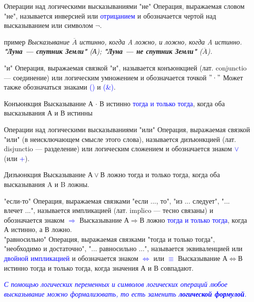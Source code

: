 \documentclass[aspectratio=169]{beamer}
\newcommand{\blu}{\textcolor{blue}}
\newcommand{\zag}{\huge\alert}
\newcommand{\n}{\normalsize}
\begin{document}
\begin{frame}[shrink=5]{Операции над логическими высказываниями}
    \zag{"не"} \n Операция, выражаемая словом \alert{"не"}, называется \alert{инверсией} или \blu{отрицанием} и обозначается чертой над высказыванием или символом $\neg$.
    
    \begin{exampleblock}{пример}
    \textit{Высказывание $\overline A$ истинно, когда A \alert{ложно}, и ложно, когда A \alert{истинно}.\\
    \textbf{"Луна — спутник Земли"} (А); \textbf{"Луна — не спутник Земли"} ($\overline A$).}
    \end{exampleblock}
    
    \zag{"и"} \n Операция, выражаемая связкой \alert{"и"}, называется \alert{конъюнкцией} (лат. conjunctio — соединение) или \alert{логическим умножением} и обозначается точкой \blu{$"\cdot"$} Может также обозначаться знаками \blu{(\wedge)} и \blu{(\&)}. 
    
    \begin{block}{Конъюнкция}
    Высказывание \alert{А $\cdot$ В} истинно \blu{тогда и только тогда}, когда оба высказывания \alert{А} и \alert{В} истинны
    \end{block}
\end{frame}
\begin{frame}[shrink=18]{Операции над логическими высказываниями}
    \zag{"или"} \n Операция, выражаемая связкой \alert{"или"} (в неисключающем смысле этого слова), называется \alert{дизъюнкцией} (лат. disjunctio — разделение) или \alert{логическим сложением} и обозначается знаком \blu{$\vee$} (или \blu{+}).
    
    \begin{block}{Дизъюнкция}
    Высказывание \alert{$А \vee В$} ложно тогда и только тогда, когда оба высказывания \alert{A} и \alert{B} ложны.
    \end{block} 
    
    \zag{"если-то"} \n Операция, выражаемая связками \alert{"если ..., то"},  \alert{"из ... следует"},  \alert{"... влечет ..."}, называется \alert{импликацией} (лат. implico — тесно связаны) и обозначается знаком  \blu{$\Rightarrow$} Высказывание \alert{А$\Rightarrow$В} ложно \blu{тогда и только тогда}, когда  \alert{А  истинно},  а  \alert{В  ложно}.\\
    \vspace{10pt}
    \zag{"равносильно"} \n Операция, выражаемая связками \alert{"тогда и только тогда"}, \alert{"необходимо и достаточно"}, \alert{"... равносильно ..."}, называется \alert{эквиваленцией} или \blu{двойной импликацией} и обозначается знаком \blu{$\Leftrightarrow$} или \blu{$\equiv$} Высказывание \alert{А$\Leftrightarrow$В}    истинно тогда и только тогда, когда \alert{значения А и В совпадают}.
    
    \textit{\blu{\small *С помощью логических переменных и символов логических операций любое высказывание можно формализовать, то есть заменить \textbf{логической формулой}.}}
    \end{frame}
\end{document}
